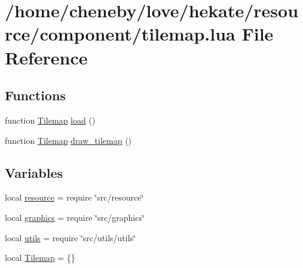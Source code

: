 \hypertarget{tilemap_8lua}{\section{/home/cheneby/love/hekate/resource/component/tilemap.lua File Reference}
\label{tilemap_8lua}
}
\subsection*{Functions}
\begin{DoxyCompactItemize}
\item 
function \hyperlink{tilemap_8lua_ac9e355a21406160a79936e89b3ef12ca}{Tilemap} \hyperlink{tilemap_8lua_a03ba94f58f782ea07eb3d96c8e60c69f}{load} ()
\item 
function \hyperlink{tilemap_8lua_ac9e355a21406160a79936e89b3ef12ca}{Tilemap} \hyperlink{tilemap_8lua_a89fa7933d53d67a780aa9ef217446bf7}{draw\-\_\-tilemap} ()
\end{DoxyCompactItemize}
\subsection*{Variables}
\begin{DoxyCompactItemize}
\item 
local \hyperlink{tilemap_8lua_a24ad487107aaa56bef35825abbe9773d}{resource} = require \char`\"{}src/resource\char`\"{}
\item 
local \hyperlink{tilemap_8lua_aae06ace8bee01f93d02dfaa4436de916}{graphics} = require \char`\"{}src/graphics\char`\"{}
\item 
local \hyperlink{tilemap_8lua_a9b2ba82def3d3656dc370bac0a641700}{utils} = require \char`\"{}src/utils/utils\char`\"{}
\item 
local \hyperlink{tilemap_8lua_ac9e355a21406160a79936e89b3ef12ca}{Tilemap} = \{\}
\end{DoxyCompactItemize}


